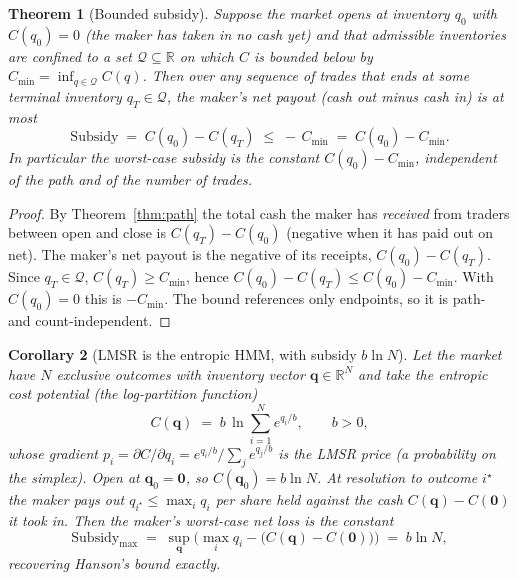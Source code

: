 \documentclass[11pt]{article}
\newtheorem{theorem}{Theorem}
\newtheorem{corollary}[theorem]{Corollary}
\newcommand{\R}{\ensuremath{\mathbb{R}}}
\begin{document}
\begin{theorem}[Bounded subsidy]
\label{thm:bounded-loss}
Suppose the market opens at inventory $q_0$ with $C(q_0)=0$ (the maker has taken in
no cash yet) and that admissible inventories are confined to a set
$\mathcal{Q}\subseteq\R$ on which $C$ is bounded below by $C_{\min} =
\inf_{q\in\mathcal{Q}} C(q)$. Then over \emph{any} sequence of trades that ends at
some terminal inventory $q_T\in\mathcal{Q}$, the maker's net payout (cash out minus
cash in) is at most
\begin{equation}
\mathrm{Subsidy} \;=\; C(q_0) - C(q_T) \;\le\; -\,C_{\min} \;=\; C(q_0) - C_{\min}.
\label{eq:subsidy}
\end{equation}
In particular the worst-case subsidy is the constant $C(q_0)-C_{\min}$, independent
of the path and of the number of trades.
\end{theorem}

\begin{proof}
By Theorem~\ref{thm:path} the total cash the maker has \emph{received} from traders
between open and close is $C(q_T)-C(q_0)$ (negative when it has paid out on net).
The maker's net payout is the negative of its receipts, $C(q_0)-C(q_T)$. Since
$q_T\in\mathcal{Q}$, $C(q_T)\ge C_{\min}$, hence
$C(q_0)-C(q_T)\le C(q_0)-C_{\min}$. With $C(q_0)=0$ this is $-C_{\min}$. The bound
references only endpoints, so it is path- and count-independent.
\end{proof}

\begin{corollary}[LMSR is the entropic HMM, with subsidy $b\ln N$]
\label{cor:lmsr}
Let the market have $N$ exclusive outcomes with inventory vector
$\bm{q}\in\R^N$ and take the entropic cost potential (the log-partition function)
\begin{equation}
C(\bm{q}) \;=\; b\,\ln\!\sum_{i=1}^N e^{q_i/b}, \qquad b>0,
\label{eq:lmsr}
\end{equation}
whose gradient $p_i = \partial C/\partial q_i = e^{q_i/b}/\sum_j e^{q_j/b}$ is the
LMSR price (a probability on the simplex). Open at $\bm{q}_0=\bm 0$, so
$C(\bm{q}_0)=b\ln N$. At resolution to outcome $i^\star$ the maker pays out
$q_{i^\star}\le\max_i q_i$ per share held against the cash $C(\bm q)-C(\bm 0)$ it
took in. Then the maker's worst-case net loss is the constant
\begin{equation}
\mathrm{Subsidy}_{\max}
   \;=\; \sup_{\bm q}\Big(\max_i q_i - \big(C(\bm q)-C(\bm 0)\big)\Big)
   \;=\; b\ln N,
\end{equation}
recovering Hanson's bound exactly.
\end{corollary}
\end{document}
